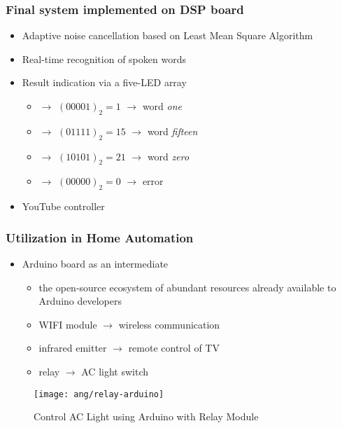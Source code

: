 
\begin{frame}
\frametitle{Final system implemented on DSP board}
\begin{itemize}
	\item Adaptive noise cancellation based on Least Mean Square Algorithm
	\item Real-time recognition of spoken words
	\item Result indication via a five-LED array
		\begin{itemize}
		\item \LED\offLED\offLED\offLED\offLED\onLED $\longrightarrow$ $(00001)_2 = 1$ $\longrightarrow$ word \textit{one}
		\item \LED\offLED\onLED\onLED\onLED\onLED $\longrightarrow$ $(01111)_2 = 15$ $\longrightarrow$ word \textit{fifteen}
		\item \LED\onLED\offLED\onLED\offLED\onLED $\longrightarrow$ $(10101)_2 = 21$ $\longrightarrow$ word \textit{zero}
		\item \LED\offLED\offLED\offLED\offLED\offLED $\longrightarrow$ $(00000)_2 = 0$ $\longrightarrow$ error
		\end{itemize}
	\item YouTube controller
\end{itemize}
\end{frame}


\begin{frame}
\frametitle{Utilization in Home Automation}
\begin{itemize}
	\item Arduino\textsuperscript{\textregistered} board as an intermediate
		\begin{itemize}
		\item the open-source ecosystem of abundant resources already available to Arduino developers
		\item WIFI module $\longrightarrow$ wireless communication
		\item infrared emitter $\longrightarrow$ remote control of TV
		\item relay $\longrightarrow$ AC light switch
		\end{itemize}
\end{itemize}

\begin{figure}[H]
\centering
\texttt{[image: ang/relay-arduino]}
\caption{Control AC Light using Arduino with Relay Module \cite{relay-arduino}}
\end{figure}
\end{frame}
